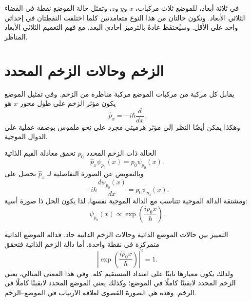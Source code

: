 في ثلاثة أبعاد، للموضع ثلاث مركبات، \(x\) و\(y\) و\(z\)، وتمثل حالة الموضع نقطة في الفضاء الثلاثي الأبعاد. وتكون حالتان من هذا النوع متعامدتين كلما اختلفت النقطتان في إحداثي واحد على الأقل. وسيُحتفَظ عادةً بالترميز أحادي البعد، مع فهم التعميم الثلاثي الأبعاد المناظر.

\section{الزخم وحالات الزخم المحدد}

يقابل كل مركبة من مركبات الموضع مركبة مناظرة من الزخم. وفي تمثيل الموضع يكون مؤثر الزخم على طول محور \(x\) هو
\begin{equation}
\hat p_x=-i\hbar\frac{d}{dx}.
\end{equation}
وهكذا يمكن أيضًا النظر إلى مؤثر هرميتي مجرد على نحو ملموس بوصفه عملية على الدوال الموجية.

الحالة ذات الزخم المحدد \(p_0\) تحقق معادلة القيم الذاتية
\begin{equation}
\hat p_x\psi_{p_0}(x)=p_0\psi_{p_0}(x).
\end{equation}
وبالتعويض عن الصورة التفاضلية لـ \(\hat p_x\) نحصل على
\begin{equation}
-i\hbar\frac{d\psi_{p_0}(x)}{dx}
=p_0\psi_{p_0}(x).
\end{equation}
ومشتقة الدالة الموجية تتناسب مع الدالة الموجية نفسها، لذا يكون الحل ذا صورة أسية:
\begin{equation}
\psi_{p_0}(x)\propto
\exp\left(\frac{ip_0x}{\hbar}\right).
\end{equation}

\begin{classroomqa}
\end{classroomqa}

التمييز بين حالات الموضع الذاتية وحالات الزخم الذاتية حاد. فدالة الموضع الذاتية متمركزة في نقطة واحدة. أما دالة الزخم الذاتية فتحقق
\begin{equation}
\left|\exp\left(\frac{ip_0x}{\hbar}\right)\right|^2=1.
\end{equation}
ولذلك يكون معيارها ثابتًا على امتداد المستقيم كله. وفي هذا المعنى المثالي، يعني الزخم المحدد لايقينًا كاملًا في الموضع؛ وكذلك يعني الموضع المحدد لايقينًا كاملًا في الزخم. وهذه هي الصورة القصوى لعلاقة الارتياب في الموضع--الزخم.


